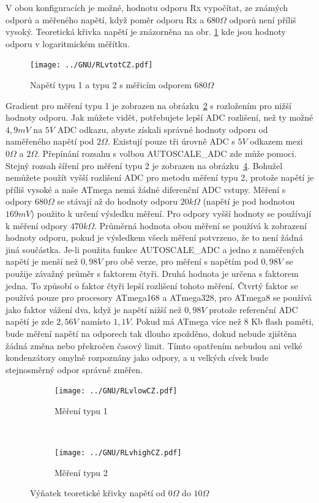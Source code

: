 V obou konfiguracích je možné, hodnotu odporu Rx vypočítat, ze známých odporů
a měřeného napětí, když poměr odporu Rx a \(680\Omega\) odporů není příliš vysoký.
Teoretická křivka napětí je znázorněna na obr. \ref{fig:RLvtot} kde jsou hodnoty odporu
v logaritmickém měřítku.
\begin{figure}[H]
\centering
\texttt{[image: ../GNU/RLvtotCZ.pdf]}
\caption{Napětí typu 1 a typu 2 s měřicím odporem \(680\Omega\) }
\label{fig:RLvtot}
\end{figure}
Gradient pro měření typu 1 je zobrazen na obrázku~\ref{fig:RLvlow} s rozložením pro nižší hodnoty odporu.
Jak můžete vidět, potřebujete lepší  ADC rozlišení, než ty možné \(4,9mV\) na \(5V\) ADC odkazu,
abyste získali správné hodnoty odporu od naměřeného napětí pod \(2\Omega\).
Existují pouze tři úrovně ADC s \(5V\) odkazem mezi \(0\Omega\) a \(2\Omega\).
Přepínání rozsahu s volbou AUTOSCALE\_ADC zde může pomoci.
Stejný rozsah šíření pro měření typu 2 je zobrazen na obrázku~\ref{fig:RLvhigh}.
Bohužel nemůžete použít vyšší rozlišení ADC pro metodu měření typu 2,
protože napětí je příliš vysoké a naše ATmega nemá žádné diferenční ADC vstupy.
Měření s odpory \(680\Omega\)  se stávají až do hodnoty odporu \(20k\Omega\)  (napětí je pod
hodnotou \(169mV\)) použito k určení výsledku měření.
Pro odpory vyšší hodnoty se používají k měření odpory \(470k\Omega\).
Průměrná hodnota obou měření se používá k zobrazení hodnoty odporu, pokud je výsledkem všech měření potvrzeno,
že to není žádná jiná součástka.
Je-li použita funkce AUTOSCALE\_ADC a jedno z naměřených napětí je menší než \(0,98V\) pro obě verze,
pro měření s napětím pod \(0,98V\) se použije závažný průměr s faktorem čtyři.
Druhá hodnota je určena s faktorem jedna.
To způsobí o faktor čtyři lepší rozlišení tohoto měření.
Čtvrtý faktor se používá pouze pro procesory ATmega168 a ATmega328, pro ATmega8 se používá jako
faktor vážení dva, když je napětí nižší než \(0,98V\) protože referenční ADC napětí
je zde \(2,56V\) namísto \(1,1V\).
Pokud má ATmega více než 8 Kb flash paměti, bude měření napětí na odporech tak dlouho zpožděno,
dokud nebude zjištěna žádná změna nebo překročen časový limit.
Tímto opatřením nebudou ani velké kondenzátory omylně rozpoznány jako odpory,
a u velkých cívek bude stejnosměrný odpor správně změřen.

\begin{figure}[H]
  \begin{subfigure}[b]{.5\textwidth}
    \centering
    \texttt{[image: ../GNU/RLvlowCZ.pdf]}
    \caption{Měření typu 1}
    \label{fig:RLvlow}
  \end{subfigure}
  ~
  \begin{subfigure}[b]{.5\textwidth}
    \centering
    \texttt{[image: ../GNU/RLvhighCZ.pdf]}
    \caption{Měření typu 2}
    \label{fig:RLvhigh}
  \end{subfigure}
  \caption{Výňatek teoretické křivky napětí od \(0\Omega\) do \(10\Omega\)}
\end{figure}


